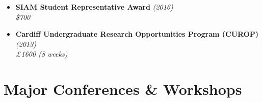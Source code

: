 \documentclass[10pt,a4paper,sans]{moderncv}        %
\begin{document}
\begin{multicols}{2}
\begin{itemize}
\vspace{6pt}

\item \textbf{SIAM Student Representative Award} \textit{(2016)}\\
\textit{\$700}

\vspace{6pt}

\item \textbf{Cardiff Undergraduate Research Opportunities Program (CUROP)} \textit{(2013)} \\
\textit{£1600 (8 weeks)}

\end{itemize}
\end{multicols}

\section{Major Conferences \& Workshops}

\vspace{6pt}
\end{document}
